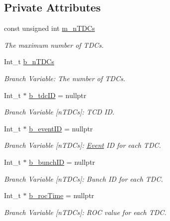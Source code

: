 \subsection*{Private Attributes}
\begin{DoxyCompactItemize}
\item 
const unsigned int \hyperlink{class_event_tree_manager_a87c672aa1531b362b15eddf11cab00c8}{m\+\_\+n\+T\+D\+Cs}
\begin{DoxyCompactList}\small\item\em The maximum number of T\+D\+Cs. \end{DoxyCompactList}\item 
Int\+\_\+t \hyperlink{class_event_tree_manager_ac7c4c6582ba687f5f2f63722085265ee}{b\+\_\+n\+T\+D\+Cs}
\begin{DoxyCompactList}\small\item\em Branch Variable\+: The number of T\+D\+Cs. \end{DoxyCompactList}\item 
Int\+\_\+t $\ast$ \hyperlink{class_event_tree_manager_a3dd2c17302ebd25d8148d8ae1aad2934}{b\+\_\+tdc\+ID} = nullptr
\begin{DoxyCompactList}\small\item\em Branch Variable \mbox{[}n\+T\+D\+Cs\mbox{]}\+: T\+CD ID. \end{DoxyCompactList}\item 
Int\+\_\+t $\ast$ \hyperlink{class_event_tree_manager_aee650c097b97fb10cb7d187a67b140dc}{b\+\_\+event\+ID} = nullptr
\begin{DoxyCompactList}\small\item\em Branch Variable \mbox{[}n\+T\+D\+Cs\mbox{]}\+: \hyperlink{class_event}{Event} ID for each T\+DC. \end{DoxyCompactList}\item 
Int\+\_\+t $\ast$ \hyperlink{class_event_tree_manager_af058bf8cb0ba8ec529ade0af79fe1678}{b\+\_\+bunch\+ID} = nullptr
\begin{DoxyCompactList}\small\item\em Branch Variable \mbox{[}n\+T\+D\+Cs\mbox{]}\+: Bunch ID for each T\+DC. \end{DoxyCompactList}\item 
Int\+\_\+t $\ast$ \hyperlink{class_event_tree_manager_af829d81256c1722f7f7c9d083a0ab2af}{b\+\_\+roc\+Time} = nullptr
\begin{DoxyCompactList}\small\item\em Branch Variable \mbox{[}n\+T\+D\+Cs\mbox{]}\+: R\+OC value for each T\+DC. \end{DoxyCompactList}\item 

\end{DoxyCompactItemize}

